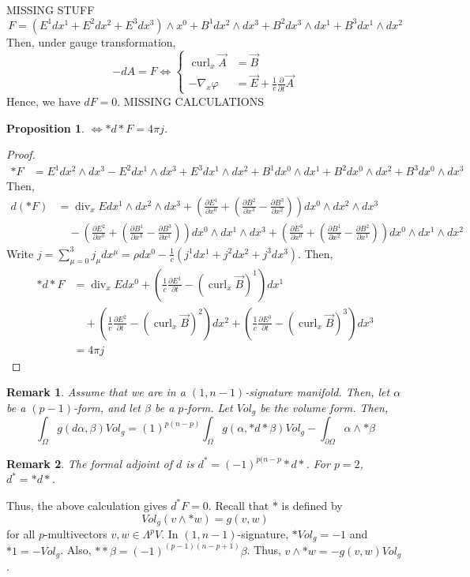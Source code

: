 \documentclass{article}
\newcommand{\al}{\alpha}
\newcommand{\be}{\beta}
\newcommand{\vhi}{\varphi}
\newcommand{\pd}[1]{\frac{\partial}{\partial #1}}
\newcommand{\pdof}[2]{\frac{\partial #1}{\partial #2}}
\DeclareMathOperator{\Div}{div}
\DeclareMathOperator{\curl}{curl}
\newtheorem{prop}{Proposition}
\newtheorem{rk}{Remark}
\begin{document}
MISSING STUFF
\[F = (E^1dx^1+E^2dx^2 + E^3dx^3)\wedge x^0 + B^1dx^2\wedge dx^3 + B^2 dx^3\wedge dx^1 + B^3 dx^1\wedge dx^2\]
Then, under gauge transformation, 
\[-dA=F\Leftrightarrow \left\{\begin{aligned}
    \curl_x\vec A &= \vec B\\
    -\nabla_x\vhi &= \vec E + \frac{1}{c}\pd{t}\vec A
\end{aligned}\right.\]
Hence, we have $dF = 0$. MISSING CALCULATIONS
\begin{prop}
    $\Leftrightarrow *d*F = 4\pi j$.
\end{prop}
\begin{proof}
    \begin{align*}
        *F &= E^1dx^2\wedge dx^3 - E^2dx^1\wedge dx^3 + E^3dx^1\wedge dx^2 + B^1dx^0\wedge dx^1 + B^2dx^0\wedge dx^2 + B^3dx^0\wedge dx^3
    \end{align*}
    Then,
    \begin{align*}
        d(*F) &= \Div_x E dx^1\wedge dx^2\wedge dx^3 + \left(\pdof{E^1}{x^0} + \left(\pdof{B^2}{x^3} - \pdof{B^3}{x^2}\right)\right)dx^0\wedge dx^2\wedge dx^3\\
        &\quad-\left(\pdof{E^2}{x^0} + \left(\pdof{B^1}{x^3} - \pdof{B^3}{x^1}\right)\right)dx^0\wedge dx^1\wedge dx^3+\left(\pdof{E^3}{x^0} + \left(\pdof{B^1}{x^2} - \pdof{B^2}{x^1}\right)\right)dx^0\wedge dx^1\wedge dx^2
    \end{align*}
    Write $j = \sum_{\mu=0}^3 j_\mu dx^\mu = \rho dx^0 - \frac{1}{c}\left(j^1dx^1 + j^2 dx^2 + j^3 dx^3\right)$. Then,
    \begin{align*}
        *d*F &= \Div_x E dx^0 + \left(\frac{1}{c}\pdof{E^1}{t} - (\curl_x\vec B)^1\right)dx^1\\
        &\quad +\left(\frac{1}{c}\pdof{E^2}{t} - (\curl_x\vec B)^2\right)dx^2 + \left(\frac{1}{c}\pdof{E^3}{t} - (\curl_x\vec B)^3\right)dx^3\\
        &=4\pi j
    \end{align*}
\end{proof}
\begin{rk}
    Assume that we are in a $(1,n-1)$-signature manifold. Then, let $\al$ be a $(p-1)$-form, and let $\be$ be a $p$-form. Let $Vol_g$ be the volume form. Then,
    \[\int_\Omega g(d\al, \be)Vol_g = (1)^{p(n-p)}\int_\Omega g(\al, *d*\be)Vol_g - \int_{\partial\Omega}\al\wedge *\be\]
\end{rk}
\begin{rk}
    The formal adjoint of $d$ is $d^* = (-1)^{p(n-p}*d*$. For $p=2$, $d^* = *d*$.
\end{rk}
Thus, the above calculation gives $d^*F =0$. Recall that $*$ is defined by 
\[Vol_g(v\wedge *w) = g(v,w)\]
for all $p$-multivectors $v,w\in \Lambda^pV$. In $(1,n-1)$-signature, $*Vol_g = -1$ and $*1 = -Vol_g$. Also, $**\be = (-1)^{(p-1)(n-p+1)}\be$. Thus, $v\wedge *w = -g(v,w)Vol_g$. 
\end{document}
